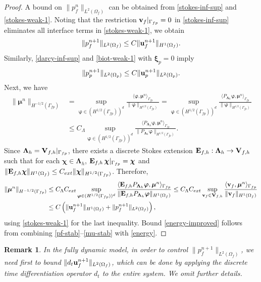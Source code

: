 \documentclass[11pt]{article}
\def\u{{\bf u}}
\def\bv{{\bf v}}
\def\bxi{\boldsymbol{\xi}}
\def\bchi{\boldsymbol{\chi}}
\def\bmu{\boldsymbol{\mu}}
\def\bvarphi{\boldsymbol{\varphi}}
\def\bL{\boldsymbol{\Lambda}}
\def\V{{\bf V}}
\def\<{\langle}
\def\>{\rangle}
\def\dt{d_t}
\newtheorem{remark}{Remark}[section]
\begin{document}
\begin{proof}
A bound on $\|p_f^n\|_{L^2(\Omega_f)}$ can be obtained from \eqref{stokes-inf-sup} and \eqref{stokes-weak-1}. Noting that the restriction $\bv_f|_{\Gamma_{fp}} = 0$ in \eqref{stokes-inf-sup} eliminates all interface terms in \eqref{stokes-weak-1}, we obtain
\begin{equation}\label{pf-stab}
\|p_f^{n+1}\|_{L^2(\Omega_f)} \le C \|\u_f^{n+1}\|_{H^1(\Omega_f)}.
\end{equation}
%
Similarly, \eqref{darcy-inf-sup} and \eqref{biot-weak-1} with $\bxi_{p} = 0$ imply
%
\begin{equation}\label{pp-stab}
  \|p_p^{n+1}\|_{L^2(\Omega_p)} \le C \|\u_p^{n+1}\|_{L^2(\Omega_p)}.
\end{equation}
%
Next, we have
%
\begin{align*}
  \|\bmu^n\|_{H^{-1/2}(\Gamma_{fp})} & = \sup_{\bvarphi \in (H^{1/2}(\Gamma_{fp}))^d} \frac{\<\bvarphi,\bmu^n\>_{\Gamma_{fp}}}{\|\bvarphi\|_{H^{1/2}(\Gamma_{fp})}}
  = \sup_{\bvarphi \in (H^{1/2}(\Gamma_{fp}))^d} \frac{\<P_{\bL_h}\bvarphi,\bmu^n\>_{\Gamma_{fp}}}{\|\bvarphi\|_{H^{1/2}(\Gamma_{fp})}} \\
&  \le C_\Lambda\sup_{\bvarphi \in (H^{1/2}(\Gamma_{fp}))^d} \frac{\<P_{\bL_h}\bvarphi,\bmu^n\>_{\Gamma_{fp}}}{\|P_{\bL_h}\bvarphi\|_{H^{1/2}(\Gamma_{fp})}}.
\end{align*}
%
Since $\bL_h = \V_{f,h}|_{\Gamma_{fp}}$, there exists a discrete Stokes extension ${\bf E}_{f,h}: \bL_h \to \V_{f,h}$ such that for each $\bchi \in \bL_h$, ${\bf E}_{f,h} \, \bchi|_{\Gamma_{fp}} = \bchi$ and
$\|{\bf E}_{f,h}\bchi\|_{H^1(\Omega_f)} \le C_{ext}\|\bchi\|_{H^{1/2}(\Gamma_{fp})}$. Therefore,
%
\begin{align}\label{mu-stab}
  \|\bmu^n\|_{H^{-1/2}(\Gamma_{fp})} & \le C_\Lambda C_{ext}\sup_{\bvarphi \in (H^{1/2}(\Gamma_{fp}))^d} \frac{\<{\bf E}_{f,h} P_{\bL_h}\bvarphi,\bmu^n\>_{\Gamma_{fp}}}{\|{\bf E}_{f,h}P_{\bL_h}\bvarphi\|_{H^1(\Omega_f)}}
  \le C_\Lambda C_{ext}\sup_{\bv_f \in \V_{f,h}}\frac{\<\bv_f,\bmu^n\>_{\Gamma_{fp}}}{\|\bv_f\|_{H^1(\Omega_f)}}
  \nonumber \\
&  \le C\left(\|\u_f^{n+1}\|_{H^1(\Omega_f)} + \|p_f^{n+1}\|_{L^2(\Omega_f)}\right),
\end{align}
%
using \eqref{stokes-weak-1} for the last inequality. Bound \eqref{energy-improved} follows from combining \eqref{pf-stab}--\eqref{mu-stab} with \eqref{energy}.
\end{proof}

\begin{remark}
In the fully dynamic model, in order to control $\|p_f^{n+1}\|_{L^2(\Omega_f)}$, we need first to bound $\|\dt \u_f^{n+1}\|_{L^2(\Omega_f)}$, which can be done by applying the discrete time differentiation operator $\dt$ to the entire system. We omit further details.
\end{remark}
\end{document}
